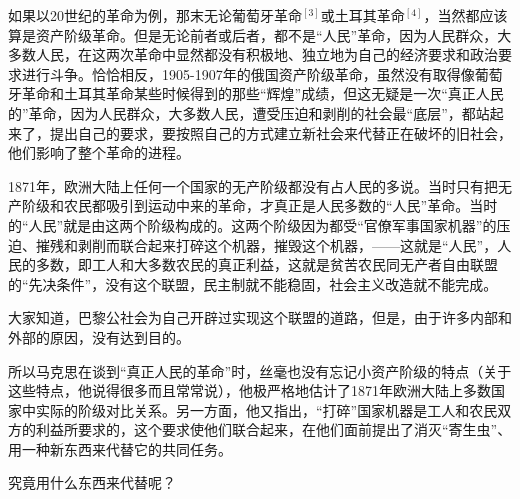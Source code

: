 如果以20世纪的革命为例，那末无论葡萄牙革命$^{[3]}$或土耳其革命$^{[4]}$，当然都应该算是资产阶级革命。但是无论前者或后者，都不是“人民”革命，因为人民群众，大多数人民，在这两次革命中显然都没有积极地、独立地为自己的经济要求和政治要求进行斗争。恰恰相反，1905-1907年的俄国资产阶级革命，虽然没有取得像葡萄牙革命和土耳其革命某些时候得到的那些“辉煌”成绩，但这无疑是一次“真正人民的”革命，因为人民群众，大多数人民，遭受压迫和剥削的社会最“底层”，都站起来了，提出{\kaishu 自己的}要求，要按照{\kaishu 自己的}方式建立新社会来代替正在破坏的旧社会，他们影响了整个革命的进程。

1871年，欧洲大陆上任何一个国家的无产阶级都没有占人民的多说。当时只有把无产阶级和农民都吸引到运动中来的革命，才真正是人民多数的“人民”革命。当时的“人民”就是由这两个阶级构成的。这两个阶级因为都受“官僚军事国家机器”的压迫、摧残和剥削而联合起来{\kaishu 打碎}这个机器，{\kaishu 摧毁}这个机器，——这就是“人民”，人民的多数，即工人和大多数农民的真正利益，这就是贫苦农民同无产者自由联盟的“先决条件”，没有这个联盟，民主制就不能稳固，社会主义改造就不能完成。

大家知道，巴黎公社会为自己开辟过实现这个联盟的道路，但是，由于许多内部和外部的原因，没有达到目的。

所以马克思在谈到“真正人民的革命”时，丝毫也没有忘记小资产阶级的特点（关于这些特点，他说得很多而且常常说），他极严格地估计了1871年欧洲大陆上多数国家中实际的阶级对比关系。另一方面，他又指出，“打碎”国家机器是工人和农民双方的利益所要求的，这个要求使他们联合起来，在他们面前提出了消灭“寄生虫”、用一种新东西来代替它的共同任务。

究竟用什么东西来代替呢？











